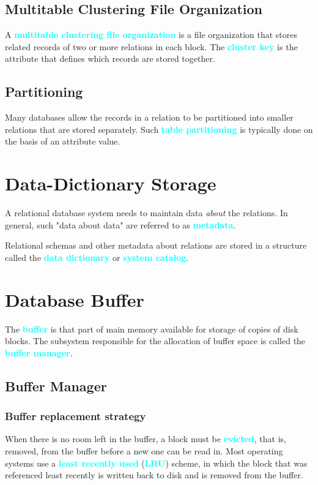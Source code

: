 \documentclass[a4paper,12pt,twoside,openany]{book}
\newcommand{\textcy}[1]{\textbf{\textcolor{cyan}{#1}}}
\begin{document}
\subsection{Multitable Clustering File Organization}

A \textcy{multitable clustering file organization} is a file organization that stores related records of two or more relations in each block. The \textcy{cluster key} is the attribute that defines which records are stored together.

\subsection{Partitioning}

Many databases allow the records in a relation to be partitioned into smaller relations that are stored separately. Such \textcy{table partitioning} is typically done on the basis of an attribute value.

\section{Data-Dictionary Storage}

A relational database system needs to maintain data \textit{about} the relations. In general, such "data about data" are referred to as \textcy{metadata}.

Relational schemas and other metadata about relations are stored in a structure called the \textcy{data dictionary} or \textcy{system catalog}.

\section{Database Buffer}

The \textcy{buffer} is that part of main memory available for storage of copies of disk blocks. The subsystem responsible for the allocation of buffer space is called the \textcy{buffer manager}.

\subsection{Buffer Manager}
\subsubsection{Buffer replacement strategy}

When there is no room left in the buffer, a block must be \textcy{evicted}, that is, removed, from the buffer before a new one can be read in. Most operating systems use a \textcy{least recently used} (\textcy{LRU}) scheme, in which the block that was referenced least recently is written back to disk and is removed from the buffer.
\end{document}
